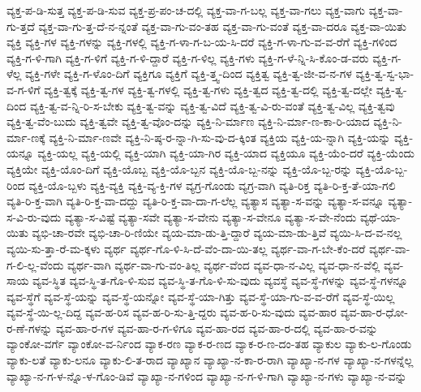 {ವ್ಯಕ್ತ-ಪ-ಡಿ-ಸುತ್ತ
ವ್ಯಕ್ತ-ಪ-ಡಿ-ಸುವ
ವ್ಯಕ್ತ-ಪ್ರ-ಪಂ-ಚ-ದಲ್ಲಿ
ವ್ಯಕ್ತ-ವಾ-ಗ-ಬಲ್ಲ
ವ್ಯಕ್ತ-ವಾ-ಗಲು
ವ್ಯಕ್ತ-ವಾಗು
ವ್ಯಕ್ತ-ವಾ-ಗು-ತ್ತದೆ
ವ್ಯಕ್ತ-ವಾ-ಗು-ತ್ತ-ದೆ-ನ-ನ್ನಂತೆ
ವ್ಯಕ್ತ-ವಾ-ಗು-ವಂ-ತಹ
ವ್ಯಕ್ತ-ವಾ-ಗು-ವಂತೆ
ವ್ಯಕ್ತ-ವಾ-ದರೂ
ವ್ಯಕ್ತ-ವಾ-ಯಿತು
ವ್ಯಕ್ತಿ
ವ್ಯಕ್ತಿ-ಗಳ
ವ್ಯಕ್ತಿ-ಗಳನ್ನು
ವ್ಯಕ್ತಿ-ಗಳಲ್ಲಿ
ವ್ಯಕ್ತಿ-ಗ-ಳಾ-ಗ-ಬ-ಯ-ಸಿ-ದರೆ
ವ್ಯಕ್ತಿ-ಗ-ಳಾ-ಗು-ವ-ವ-ರೆಗೆ
ವ್ಯಕ್ತಿ-ಗಳಿಂದ
ವ್ಯಕ್ತಿ-ಗ-ಳಿ-ಗಾಗಿ
ವ್ಯಕ್ತಿ-ಗ-ಳಿಗೆ
ವ್ಯಕ್ತಿ-ಗ-ಳಿ-ದ್ದಾರೆ
ವ್ಯಕ್ತಿ-ಗ-ಳಿಲ್ಲ
ವ್ಯಕ್ತಿ-ಗಳು
ವ್ಯಕ್ತಿ-ಗ-ಳೆ-ನ್ನಿ-ಸಿ-ಕೊಂ-ಡ-ವರು
ವ್ಯಕ್ತಿ-ಗ-ಳೆಲ್ಲ
ವ್ಯಕ್ತಿ-ಗಳೇ
ವ್ಯಕ್ತಿ-ಗ-ಳೊಂ-ದಿಗೆ
ವ್ಯಕ್ತಿಗೂ
ವ್ಯಕ್ತಿಗೆ
ವ್ಯಕ್ತಿ-ತ್ತ್ವ-ದಿಂದ
ವ್ಯಕ್ತಿತ್ವ
ವ್ಯಕ್ತಿ-ತ್ವ-ಜೀ-ವ-ನ-ಗಳ
ವ್ಯಕ್ತಿ-ತ್ವ-ಸ್ವ-ಭಾ-ವ-ಗ-ಳಿಗೆ
ವ್ಯಕ್ತಿ-ತ್ವಕ್ಕೆ
ವ್ಯಕ್ತಿ-ತ್ವ-ಗಳ
ವ್ಯಕ್ತಿ-ತ್ವ-ಗಳಲ್ಲಿ
ವ್ಯಕ್ತಿ-ತ್ವ-ಗಳು
ವ್ಯಕ್ತಿ-ತ್ವದ
ವ್ಯಕ್ತಿ-ತ್ವ-ದಲ್ಲಿ
ವ್ಯಕ್ತಿ-ತ್ವ-ದಲ್ಲೇ
ವ್ಯಕ್ತಿ-ತ್ವ-ದಿಂದ
ವ್ಯಕ್ತಿ-ತ್ವ-ವ-ನ್ನಿ-ರಿ-ಸ-ಬೇಕು
ವ್ಯಕ್ತಿ-ತ್ವ-ವನ್ನು
ವ್ಯಕ್ತಿ-ತ್ವ-ವಿದೆ
ವ್ಯಕ್ತಿ-ತ್ವ-ವಿ-ರು-ವಂತೆ
ವ್ಯಕ್ತಿ-ತ್ವ-ವಿಲ್ಲ
ವ್ಯಕ್ತಿ-ತ್ವವು
ವ್ಯಕ್ತಿ-ತ್ವ-ವೆಂ-ಬುದು
ವ್ಯಕ್ತಿ-ತ್ವವೇ
ವ್ಯಕ್ತಿ-ತ್ವ-ವೊಂ-ದನ್ನು
ವ್ಯಕ್ತಿ-ನಿ-ರ್ಮಾಣ
ವ್ಯಕ್ತಿ-ನಿ-ರ್ಮಾ-ಣ-ಕಾ-ರಿ-ಯಾದ
ವ್ಯಕ್ತಿ-ನಿ-ರ್ಮಾ-ಣಕ್ಕೆ
ವ್ಯಕ್ತಿ-ನಿ-ರ್ಮಾ-ಣವೇ
ವ್ಯಕ್ತಿ-ನಿ-ಷ್ಠ-ರ-ನ್ನಾ-ಗಿ-ಸು-ವು-ದ-ಕ್ಕಿಂತ
ವ್ಯಕ್ತಿಯ
ವ್ಯಕ್ತಿ-ಯ-ನ್ನಾಗಿ
ವ್ಯಕ್ತಿ-ಯನ್ನು
ವ್ಯಕ್ತಿ-ಯನ್ನೂ
ವ್ಯಕ್ತಿ-ಯಲ್ಲ
ವ್ಯಕ್ತಿ-ಯಲ್ಲಿ
ವ್ಯಕ್ತಿ-ಯಾಗಿ
ವ್ಯಕ್ತಿ-ಯಾ-ಗಿರ
ವ್ಯಕ್ತಿ-ಯಾದ
ವ್ಯಕ್ತಿಯೂ
ವ್ಯಕ್ತಿ-ಯೆಂ-ದರೆ
ವ್ಯಕ್ತಿ-ಯೆಂದು
ವ್ಯಕ್ತಿಯೇ
ವ್ಯಕ್ತಿ-ಯೊಂ-ದಿಗೆ
ವ್ಯಕ್ತಿ-ಯೊಬ್ಬ
ವ್ಯಕ್ತಿ-ಯೊ-ಬ್ಬನ
ವ್ಯಕ್ತಿ-ಯೊ-ಬ್ಬ-ನನ್ನು
ವ್ಯಕ್ತಿ-ಯೊ-ಬ್ಬ-ರನ್ನು
ವ್ಯಕ್ತಿ-ಯೊ-ಬ್ಬ-ರಿಂದ
ವ್ಯಕ್ತಿ-ಯೊ-ಬ್ಬಳು
ವ್ಯಕ್ತಿ-ವ್ಯಕ್ತಿ
ವ್ಯಕ್ತಿ-ವ್ಯ-ಕ್ತಿ-ಗಳ
ವ್ಯಗ್ರ-ಗೊಂಡು
ವ್ಯಗ್ರ-ವಾಗಿ
ವ್ಯತಿ-ರಿಕ್ತ
ವ್ಯತಿ-ರಿ-ಕ್ತ-ತೆ-ಯಾ-ಗಲಿ
ವ್ಯತಿ-ರಿ-ಕ್ತ-ವಾಗಿ
ವ್ಯತಿ-ರಿ-ಕ್ತ-ವಾ-ದದ್ದು
ವ್ಯತಿ-ರಿ-ಕ್ತ-ವಾ-ದಾ-ಗ-ಲೆಲ್ಲ
ವ್ಯತ್ಯಾಸ
ವ್ಯತ್ಯಾ-ಸ-ವನ್ನು
ವ್ಯತ್ಯಾ-ಸ-ವನ್ನೂ
ವ್ಯತ್ಯಾ-ಸ-ವಿ-ರು-ವುದು
ವ್ಯತ್ಯಾ-ಸ-ವಿಷ್ಟೆ
ವ್ಯತ್ಯಾ-ಸವೇ
ವ್ಯತ್ಯಾ-ಸ-ವೇನು
ವ್ಯತ್ಯಾ-ಸ-ವೇನೂ
ವ್ಯತ್ಯಾ-ಸ-ವೇ-ನೆಂದು
ವ್ಯಥೆ-ಯಾ-ಯಿತು
ವ್ಯಭಿ-ಚಾ-ರವೇ
ವ್ಯಭಿ-ಚಾ-ರಿ-ಣಿಯೇ
ವ್ಯಯ-ಮಾ-ಡು-ತ್ತಿ-ದ್ದಾರೆ
ವ್ಯಯ-ಮಾ-ಡು-ತ್ತಿವೆ
ವ್ಯಯಿ-ಸಿ-ದ-ವ-ನಲ್ಲ
ವ್ಯಯಿ-ಸು-ತ್ತಾ-ರೆ-ಮ-ಕ್ಕಳು
ವ್ಯರ್ಥ
ವ್ಯರ್ಥ-ಗೊ-ಳಿ-ಸಿ-ದೆ-ವೆಂ-ದಾ-ಯಿ-ತಲ್ಲ
ವ್ಯರ್ಥ-ವಾ-ಗ-ಬೇ-ಕೆಂ-ದರೆ
ವ್ಯರ್ಥ-ವಾ-ಗ-ಲಿ-ಲ್ಲ-ವೆಂದು
ವ್ಯರ್ಥ-ವಾಗಿ
ವ್ಯರ್ಥ-ವಾ-ಗು-ವಂ-ತಿಲ್ಲ
ವ್ಯರ್ಥ-ವೆಂದ
ವ್ಯವ-ಧಾ-ನ-ವಿಲ್ಲ
ವ್ಯವ-ಧಾ-ನ-ವೆಲ್ಲಿ
ವ್ಯವ-ಸಾಯ
ವ್ಯವ-ಸ್ಥಿತ
ವ್ಯವ-ಸ್ಥಿ-ತ-ಗೊ-ಳಿ-ಸುವ
ವ್ಯವ-ಸ್ಥಿ-ತ-ಗೊ-ಳಿ-ಸು-ವುದು
ವ್ಯವಸ್ಥೆ
ವ್ಯವ-ಸ್ಥೆ-ಗಳನ್ನು
ವ್ಯವ-ಸ್ಥೆ-ಗಳನ್ನೂ
ವ್ಯವ-ಸ್ಥೆಗೆ
ವ್ಯವ-ಸ್ಥೆ-ಯನ್ನು
ವ್ಯವ-ಸ್ಥೆ-ಯನ್ನೋ
ವ್ಯವ-ಸ್ಥೆ-ಯಾ-ಗಿತ್ತು
ವ್ಯವ-ಸ್ಥೆ-ಯಾ-ಗು-ವ-ವ-ರೆಗೆ
ವ್ಯವ-ಸ್ಥೆ-ಯಿಲ್ಲ
ವ್ಯವ-ಸ್ಥೆ-ಯಿ-ಲ್ಲ-ದಿದ್ದ
ವ್ಯವ-ಹ-ರಿಸ
ವ್ಯವ-ಹ-ರಿ-ಸು-ತ್ತಿ-ದ್ದರು
ವ್ಯವ-ಹ-ರಿ-ಸು-ವುದು
ವ್ಯವ-ಹಾರ
ವ್ಯವ-ಹಾ-ರ-ಧೋ-ರ-ಣೆ-ಗಳನ್ನು
ವ್ಯವ-ಹಾ-ರ-ಗಳ
ವ್ಯವ-ಹಾ-ರ-ಗ-ಳಿಗೂ
ವ್ಯವ-ಹಾ-ರದ
ವ್ಯವ-ಹಾ-ರ-ದಲ್ಲಿ
ವ್ಯವ-ಹಾ-ರ-ವನ್ನು
ವ್ಯಾಂಕೋ-ವರ್ಗೆ
ವ್ಯಾಂಕೋ-ವ-ರ್ನಿಂದ
ವ್ಯಾಕ-ರಣ
ವ್ಯಾಕ-ರ-ಣದ
ವ್ಯಾಕ-ರ-ಣ-ದಂ-ತಹ
ವ್ಯಾಕುಲ
ವ್ಯಾಕು-ಲ-ಗೊಂಡು
ವ್ಯಾಕು-ಲತೆ
ವ್ಯಾಕು-ಲನೂ
ವ್ಯಾಕು-ಲಿ-ತ-ರಾದ
ವ್ಯಾಖ್ಯಾನ
ವ್ಯಾಖ್ಯಾ-ನ-ಕಾ-ರ-ರಾಗಿ
ವ್ಯಾಖ್ಯಾ-ನ-ಗಳ
ವ್ಯಾಖ್ಯಾ-ನ-ಗಳನ್ನೆಲ್ಲ
ವ್ಯಾಖ್ಯಾ-ನ-ಗ-ಳ-ನ್ನೊ-ಳ-ಗೊಂ-ಡಿವೆ
ವ್ಯಾಖ್ಯಾ-ನ-ಗಳಿಂದ
ವ್ಯಾಖ್ಯಾ-ನ-ಗ-ಳಿ-ಗಾಗಿ
ವ್ಯಾಖ್ಯಾ-ನ-ಗಳು
ವ್ಯಾಖ್ಯಾ-ನ-ವನ್ನು
}
